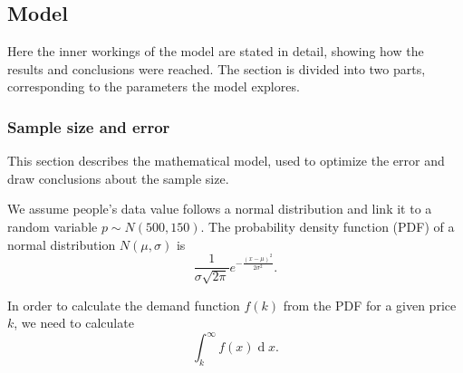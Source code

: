 \documentclass[11pt, a4paper]{article}
\theoremstyle{definition}
\begin{document}
		\subsection{Model}
			Here the inner workings of the model are stated in detail, showing how the results and conclusions were reached. The section is divided into two parts, corresponding to the parameters the model explores.
			\subsubsection{Sample size and error}
			This section describes the mathematical model, used to optimize the error and draw conclusions about the sample size.\par
			We assume people's data value follows a normal distribution and link it to a random variable $p\sim N(500, 150)$. The probability density function (PDF) of a normal distribution $N(\mu, \sigma)$ is $$\frac{1}{\sigma\sqrt{2\pi}}e^{-\frac{(x-\mu)^{2}}{2\sigma^{2}}}.$$\par\noindent
			In order to calculate the demand function $f(k)$ from the PDF for a given price $k$, we need to calculate
			$$\int_{k}^{\infty}f(x)\operatorname{d} x.$$
\end{document}
